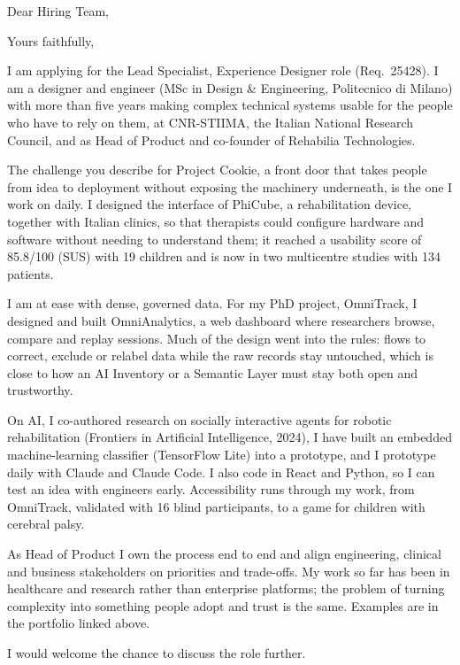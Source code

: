 \documentclass[11pt,a4paper,sans]{moderncv}
\begin{document}

\opening{Dear Hiring Team,}
\closing{Yours faithfully,}
\makelettertitle

I am applying for the Lead Specialist, Experience Designer role (Req.\ 25428). I am a designer and engineer (MSc in Design \& Engineering, Politecnico di Milano) with more than five years making complex technical systems usable for the people who have to rely on them, at CNR-STIIMA, the Italian National Research Council, and as Head of Product and co-founder of Rehabilia Technologies.

The challenge you describe for Project Cookie, a front door that takes people from idea to deployment without exposing the machinery underneath, is the one I work on daily. I designed the interface of PhiCube, a rehabilitation device, together with Italian clinics, so that therapists could configure hardware and software without needing to understand them; it reached a usability score of 85.8/100 (SUS) with 19 children and is now in two multicentre studies with 134 patients.

I am at ease with dense, governed data. For my PhD project, OmniTrack, I designed and built OmniAnalytics, a web dashboard where researchers browse, compare and replay sessions. Much of the design went into the rules: flows to correct, exclude or relabel data while the raw records stay untouched, which is close to how an AI Inventory or a Semantic Layer must stay both open and trustworthy.

On AI, I co-authored research on socially interactive agents for robotic rehabilitation (Frontiers in Artificial Intelligence, 2024), I have built an embedded machine-learning classifier (TensorFlow Lite) into a prototype, and I prototype daily with Claude and Claude Code. I also code in React and Python, so I can test an idea with engineers early. Accessibility runs through my work, from OmniTrack, validated with 16 blind participants, to a game for children with cerebral palsy.

As Head of Product I own the process end to end and align engineering, clinical and business stakeholders on priorities and trade-offs. My work so far has been in healthcare and research rather than enterprise platforms; the problem of turning complexity into something people adopt and trust is the same. Examples are in the portfolio linked above.

I would welcome the chance to discuss the role further.

\makeletterclosing
\end{document}
